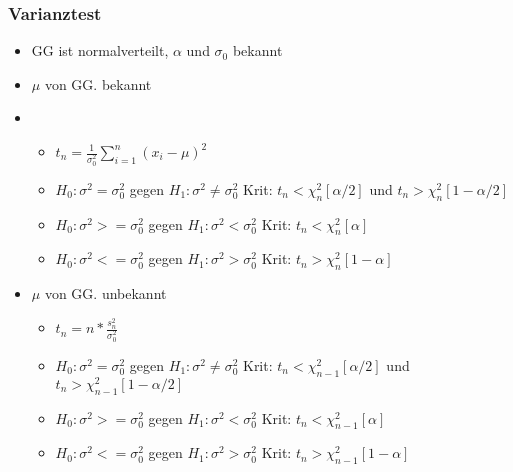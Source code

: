 \documentclass[a4paper]{article}
\begin{document}
\begin{landscape}
\begin{multicols}{4}
        \subsubsection*{Varianztest}
        \begin{itemize}[noitemsep,nolistsep,leftmargin=*]
            \item GG ist normalverteilt, $\alpha$ und $\sigma_0$ bekannt
            \item $\mu $ von GG. bekannt
            \item \begin{itemize}[noitemsep,nolistsep,leftmargin=*]
            \item $t_n= \frac{1}{\sigma^2_0} \sum^n_{i=1} (x_i-\mu)^2$
            \item $H_0: \sigma^2 = \sigma^2_0$ gegen $H_1: \sigma^2 \neq \sigma^2_0$ Krit: $t_n < \chi^2_n[\alpha/2]$ und $t_n > \chi^2_n[1-\alpha/2]$
            \item $H_0: \sigma^2 >= \sigma^2_0$ gegen $H_1: \sigma^2 < \sigma^2_0$ Krit: $t_n < \chi^2_n[\alpha]$ 
            \item $H_0: \sigma^2 <= \sigma^2_0$ gegen $H_1: \sigma^2 > \sigma^2_0$ Krit: $t_n > \chi^2_n[1-\alpha]$ 
            \end{itemize}
            \item $\mu $ von GG. unbekannt
            \begin{itemize}[noitemsep,nolistsep,leftmargin=*]
            \item $t_n= n*\frac{s^2_n}{\sigma^2_0}$
            \item $H_0: \sigma^2 = \sigma^2_0$ gegen $H_1: \sigma^2 \neq \sigma^2_0$ Krit: $t_n < \chi^2_{n-1}[\alpha/2]$ und $t_n > \chi^2_{n-1}[1-\alpha/2]$
            \item $H_0: \sigma^2 >= \sigma^2_0$ gegen $H_1: \sigma^2 < \sigma^2_0$ Krit: $t_n < \chi^2_{n-1}[\alpha]$ 
            \item $H_0: \sigma^2 <= \sigma^2_0$ gegen $H_1: \sigma^2 > \sigma^2_0$ Krit: $t_n > \chi^2_{n-1}[1-\alpha]$ 
            \end{itemize}
        \end{itemize}


\end{multicols}
\end{landscape}
\end{document}
